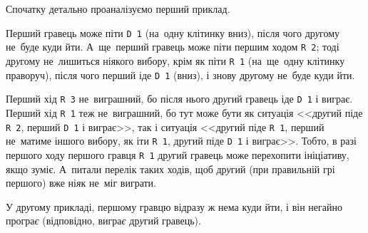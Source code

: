 \Note
Спочатку детально проаналізуємо перший приклад.

Перший гравець може піти \texttt{D~1} (на~одну клітинку вниз), після чого др{\it у}гому не~буде куди йти. А~ще~перший гравець може піти першим ходом \texttt{R~2}; тоді др{\it у}гому не~лишиться ніякого вибору, крім як піти \texttt{R~1} (на~ще~одну клітинку праворуч), після чого перший іде \texttt{D~1} (вниз), і знову др{\it у}гому не~буде куди йти. 

Перший хід \texttt{R~3} не~виграшний, бо після нього др{\it у}гий гравець іде \texttt{D~1} і виграє. 
Перший хід \texttt{R~1} теж не~виграшний, бо тут може бути як ситуація <<др{\it у}гий піде \texttt{R~2}, перший \texttt{D~1} і виграє>>, так і ситуація <<др{\it у}гий піде \texttt{R~1}, перший не~матиме іншого вибору, як іти \texttt{R~1}, др{\it у}гий піде \texttt{D~1} і виграє>>. Тобто, в разі першого ходу першого гравця \texttt{R~1} др{\it у}гий гравець може перехопити ініціативу, якщо зуміє. А~питали перелік таких ходів, щоб др{\it у}гий (при правильній грі першого) вже ні{\it я}к не~міг виграти.

У др{\it у}гому прикладі, першому гравцю відразу ж нема куди йти, і він негайно програ{\it є} (відповідно, вигра{\it є} др{\it у}гий гравець).